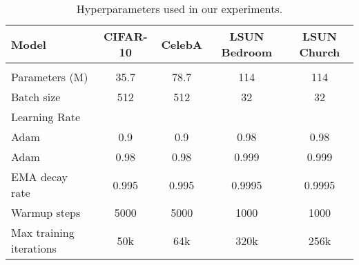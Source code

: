 \documentclass[12pt,a4paper]{article}
\begin{document}
\begin{table}[h!]
  \begin{center}
    \caption{Hyperparameters used in our experiments.} 
    \label{tab:hparams}
    \begin{tabular}{l c c c c} 
      \\ 
      Model & CIFAR-10 & CelebA & LSUN Bedroom & LSUN Church\\
      \hline \\
      Parameters (M) & 35.7 & 78.7 & 114 & 114 \\
      Batch size & 512 & 512 & 32 & 32 \\
      Learning Rate &  &  &  &  \\
      Adam  & 0.9 & 0.9 & 0.98 & 0.98 \\
      Adam  & 0.98 & 0.98 & 0.999 & 0.999 \\
      EMA decay rate & 0.995 & 0.995 & 0.9995 & 0.9995 \\
      Warmup steps & 5000 & 5000 & 1000 & 1000 \\
      Max training iterations & 50k & 64k & 320k & 256k \\
      
    \end{tabular}
  \end{center}
\end{table}
\end{document}
